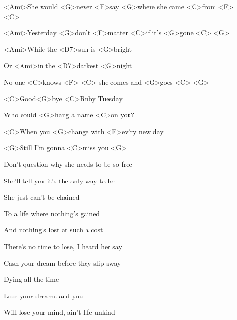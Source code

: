 

\zs
<Ami>She would <G>never <F>say <G>where she came <C>from <F> <C>

<Ami>Yesterday <G>don't <F>matter <C>if it's <G>gone <C> <G>

<Ami>While the <D7>sun is <G>bright

Or <Ami>in the <D7>darkest <G>night

No one <C>knows <F> <C> she comes and <G>goes <C> <G>
\ks

\zr
<C>Good<G>bye <C>Ruby Tuesday

Who could <G>hang a name <C>on you?

<C>When you <G>change with <F>ev'ry new day

<G>Still I'm gonna <C>miss you <G>
\kr

\zs
Don't question why she needs to be so free

She'll tell you it's the only way to be

She just can't be chained

To a life where nothing's gained

And nothing's lost at such a cost
\ks

\zr \kr

\zs
There's no time to lose, I heard her say

Cash your dream before they slip away

Dying all the time

Lose your dreams and you

Will lose your mind, ain't life unkind
\ks

\kp
